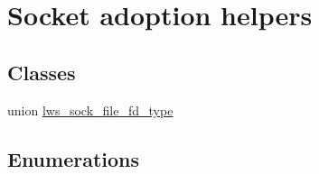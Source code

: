 \hypertarget{group__sock-adopt}{}\section{Socket adoption helpers}
\label{group__sock-adopt}
\subsection*{Classes}
\begin{DoxyCompactItemize}
\item 
union \hyperlink{unionlws__sock__file__fd__type}{lws\+\_\+sock\+\_\+file\+\_\+fd\+\_\+type}
\end{DoxyCompactItemize}
\subsection*{Enumerations}
